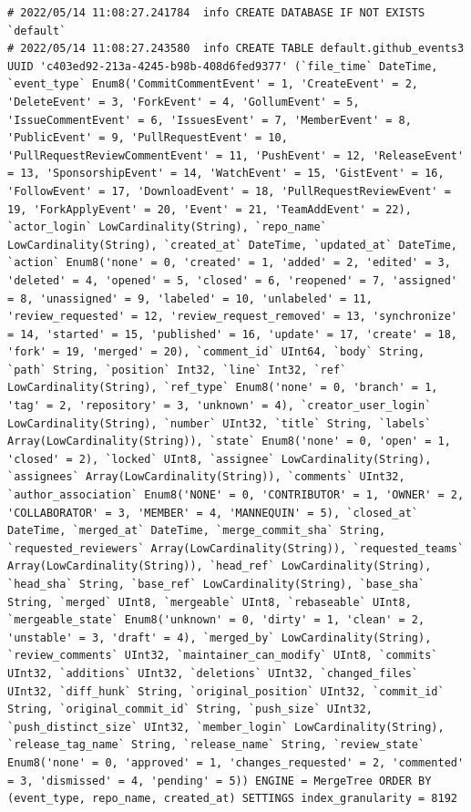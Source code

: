 \begin{verbatim}
# 2022/05/14 11:08:27.241784  info CREATE DATABASE IF NOT EXISTS `default`
# 2022/05/14 11:08:27.243580  info CREATE TABLE default.github_events3 UUID 'c403ed92-213a-4245-b98b-408d6fed9377' (`file_time` DateTime, `event_type` Enum8('CommitCommentEvent' = 1, 'CreateEvent' = 2, 'DeleteEvent' = 3, 'ForkEvent' = 4, 'GollumEvent' = 5, 'IssueCommentEvent' = 6, 'IssuesEvent' = 7, 'MemberEvent' = 8, 'PublicEvent' = 9, 'PullRequestEvent' = 10, 'PullRequestReviewCommentEvent' = 11, 'PushEvent' = 12, 'ReleaseEvent' = 13, 'SponsorshipEvent' = 14, 'WatchEvent' = 15, 'GistEvent' = 16, 'FollowEvent' = 17, 'DownloadEvent' = 18, 'PullRequestReviewEvent' = 19, 'ForkApplyEvent' = 20, 'Event' = 21, 'TeamAddEvent' = 22), `actor_login` LowCardinality(String), `repo_name` LowCardinality(String), `created_at` DateTime, `updated_at` DateTime, `action` Enum8('none' = 0, 'created' = 1, 'added' = 2, 'edited' = 3, 'deleted' = 4, 'opened' = 5, 'closed' = 6, 'reopened' = 7, 'assigned' = 8, 'unassigned' = 9, 'labeled' = 10, 'unlabeled' = 11, 'review_requested' = 12, 'review_request_removed' = 13, 'synchronize' = 14, 'started' = 15, 'published' = 16, 'update' = 17, 'create' = 18, 'fork' = 19, 'merged' = 20), `comment_id` UInt64, `body` String, `path` String, `position` Int32, `line` Int32, `ref` LowCardinality(String), `ref_type` Enum8('none' = 0, 'branch' = 1, 'tag' = 2, 'repository' = 3, 'unknown' = 4), `creator_user_login` LowCardinality(String), `number` UInt32, `title` String, `labels` Array(LowCardinality(String)), `state` Enum8('none' = 0, 'open' = 1, 'closed' = 2), `locked` UInt8, `assignee` LowCardinality(String), `assignees` Array(LowCardinality(String)), `comments` UInt32, `author_association` Enum8('NONE' = 0, 'CONTRIBUTOR' = 1, 'OWNER' = 2, 'COLLABORATOR' = 3, 'MEMBER' = 4, 'MANNEQUIN' = 5), `closed_at` DateTime, `merged_at` DateTime, `merge_commit_sha` String, `requested_reviewers` Array(LowCardinality(String)), `requested_teams` Array(LowCardinality(String)), `head_ref` LowCardinality(String), `head_sha` String, `base_ref` LowCardinality(String), `base_sha` String, `merged` UInt8, `mergeable` UInt8, `rebaseable` UInt8, `mergeable_state` Enum8('unknown' = 0, 'dirty' = 1, 'clean' = 2, 'unstable' = 3, 'draft' = 4), `merged_by` LowCardinality(String), `review_comments` UInt32, `maintainer_can_modify` UInt8, `commits` UInt32, `additions` UInt32, `deletions` UInt32, `changed_files` UInt32, `diff_hunk` String, `original_position` UInt32, `commit_id` String, `original_commit_id` String, `push_size` UInt32, `push_distinct_size` UInt32, `member_login` LowCardinality(String), `release_tag_name` String, `release_name` String, `review_state` Enum8('none' = 0, 'approved' = 1, 'changes_requested' = 2, 'commented' = 3, 'dismissed' = 4, 'pending' = 5)) ENGINE = MergeTree ORDER BY (event_type, repo_name, created_at) SETTINGS index_granularity = 8192

\end{verbatim}

